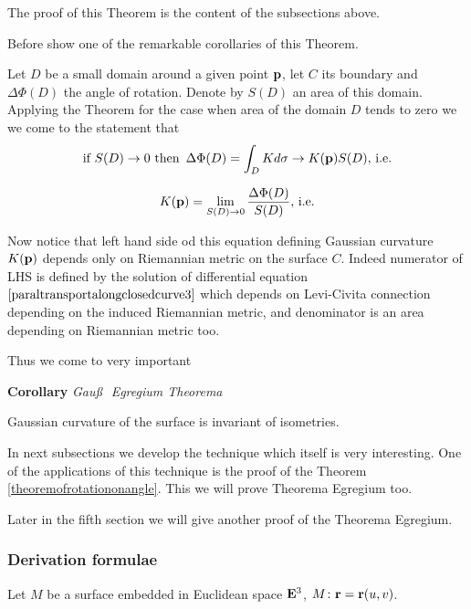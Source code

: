 \documentclass[12pt]{article}
\theoremstyle{theorem}
\numberwithin{equation}{section}
\begin{document}
{The  proof of this Theorem is the content of the subsections above.

Before show one of the remarkable corollaries of this Theorem.

Let  $D$ be a small domain around  a given point ${\bf p}$, let $C$ its boundary and
$\Delta \Phi(D)$ the angle of rotation.   Denote by $S(D)$ an area of this domain.
Applying the Theorem for the case when area of the domain $D$ tends to zero we  we come to the statement that
            $$
      \hbox{if $S(D)\to 0$ then \,} \Delta\Phi(D)=\int_D Kd\sigma\to K({\bf p})S(D),\,{\rm i.e.}
            $$

\begin{equation}\label{egregium1}
K({\bf p})=\lim_{S(D)\to 0}{\Delta\Phi(D)\over S(D)},\,{\rm i.e.}
\end{equation}

Now notice that  left hand side od this equation defining Gaussian curvature $K({\bf p})$ depends only on Riemannian
metric on the surface $C$. Indeed numerator of LHS is defined by the solution of differential equation
$\eqref{paraltransportalongclosedcurve3}$ which depends on Levi-Civita connection depending on
the induced Riemannian metric, and denominator is an area depending on Riemannian metric too.

Thus we come to very important

{\bf Corollary} {\it Gau\ss \,\, Egregium Theorema}

Gaussian curvature of the surface is invariant of isometries.


\bigskip


In next subsections we develop the technique which  itself is very interesting. One of the applications of this
technique is the proof of the Theorem \eqref{theoremofrotationonangle}.
This we will prove Theorema Egregium too.

Later in the fifth section we will give another proof of the Theorema  Egregium.

\subsubsection{ Derivation formulae}

Let $M$ be a surface embedded in  Euclidean space ${\bf E}^3$,
$M\colon {\bf r}={\bf r}(u,v)$.

}
\end{document}
